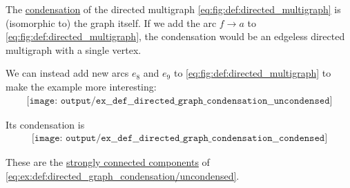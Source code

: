 \begin{example}\label{ex:def:directed_graph_condensation}
  The \hyperref[def:directed_graph_condensation]{condensation} of the directed multigraph \eqref{eq:fig:def:directed_multigraph} is (isomorphic to) the graph itself. If we add the arc \( f \to a \) to \eqref{eq:fig:def:directed_multigraph}, the condensation would be an edgeless directed multigraph with a single vertex.

  We can instead add new arcs \( e_8 \) and \( e_9 \) to \eqref{eq:fig:def:directed_multigraph} to make the example more interesting:
  \begin{equation}\label{eq:ex:def:directed_graph_condensation/uncondensed}
    \begin{aligned}
      \texttt{[image: output/ex\_\_def\_\_directed\_graph\_condensation\_\_uncondensed]}
    \end{aligned}
  \end{equation}

  Its condensation is
  \begin{equation}\label{eq:ex:def:directed_graph_condensation/condensed}
    \begin{aligned}
      \texttt{[image: output/ex\_\_def\_\_directed\_graph\_condensation\_\_condensed]}
    \end{aligned}
  \end{equation}

  These are the \hyperref[def:graph_connectedness/strong]{strongly connected components} of \eqref{eq:ex:def:directed_graph_condensation/uncondensed}.
\end{example}

